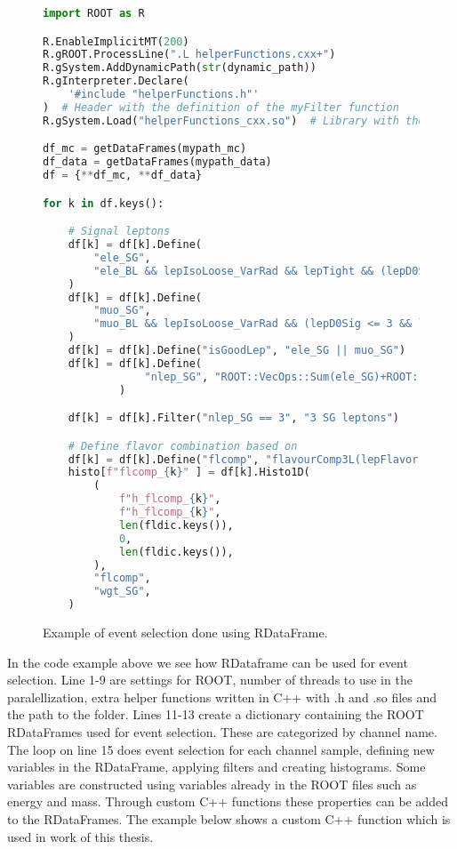 \begin{figure}[H]
    \centering
\begin{lstlisting}[language=Python, style=pythonstyle, label={code:python_func_example}]
import ROOT as R

R.EnableImplicitMT(200)
R.gROOT.ProcessLine(".L helperFunctions.cxx+")
R.gSystem.AddDynamicPath(str(dynamic_path))
R.gInterpreter.Declare(
    '#include "helperFunctions.h"'
)  # Header with the definition of the myFilter function
R.gSystem.Load("helperFunctions_cxx.so")  # Library with the myFilter function

df_mc = getDataFrames(mypath_mc)
df_data = getDataFrames(mypath_data)
df = {**df_mc, **df_data}

for k in df.keys():

    # Signal leptons
    df[k] = df[k].Define(
        "ele_SG",
        "ele_BL && lepIsoLoose_VarRad && lepTight && (lepD0Sig <= 5 && lepD0Sig >= -5)",
    )  
    df[k] = df[k].Define(
        "muo_SG",
        "muo_BL && lepIsoLoose_VarRad && (lepD0Sig <= 3 && lepD0Sig >= -3)",
    )  
    df[k] = df[k].Define("isGoodLep", "ele_SG || muo_SG")
    df[k] = df[k].Define(
                "nlep_SG", "ROOT::VecOps::Sum(ele_SG)+ROOT::VecOps::Sum(muo_SG)"
            )

    df[k] = df[k].Filter("nlep_SG == 3", "3 SG leptons")

    # Define flavor combination based on 
    df[k] = df[k].Define("flcomp", "flavourComp3L(lepFlavor[ele_SG || muo_SG])")
    histo[f"flcomp_{k}" ] = df[k].Histo1D(
        (
            f"h_flcomp_{k}",
            f"h_flcomp_{k}",
            len(fldic.keys()),
            0,
            len(fldic.keys()),
        ),
        "flcomp",
        "wgt_SG",
    )
    \end{lstlisting}
    \caption[RDataFrame code example]{Example of event selection done using RDataFrame.}
    \label{code:rdata}
\end{figure}

In the code example above we see how RDataframe can be used for event selection. Line 1-9 are settings for ROOT, 
number of threads to use in the paralellization, extra helper functions written in C++ with .h and .so files and the path to the folder.
Lines 11-13 create a dictionary containing the ROOT RDataFrames used for event selection. These are categorized by channel name. 
The loop on line 15 does event selection for each channel sample, defining new variables in the RDataFrame, applying filters and creating histograms.
Some variables are constructed using variables already in the ROOT files such as energy and mass. Through custom C++ functions
these properties can be added to the RDataFrames. The example below shows a custom C++ function which is used in work of this thesis.

